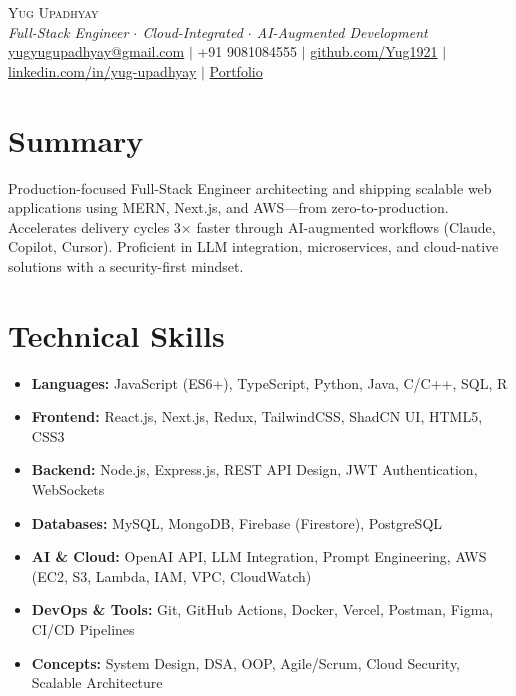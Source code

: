 \documentclass[letterpaper,10pt]{article}
\newcommand{\resumeItem}[1]{\item\small{#1\vspace{0.5pt}}}
\begin{document}
\begin{center}
  {\huge \scshape Yug Upadhyay} \\ \vspace{3pt}
  \textit{Full-Stack Engineer $\cdot$ Cloud-Integrated $\cdot$ AI-Augmented Development} \\ \vspace{4pt}
  \small
  \href{mailto:yugyugupadhyay@gmail.com}{yugyugupadhyay@gmail.com} $|$
  +91 9081084555 $|$
  \href{https://github.com/Yug1921}{github.com/Yug1921} $|$
  \href{https://linkedin.com/in/yug-upadhyay}{linkedin.com/in/yug-upadhyay} $|$
  \href{https://www.yug21.tech/}{Portfolio} 
\end{center}



\section*{ Summary}
\vspace{2pt}
\small Production-focused Full-Stack Engineer architecting and shipping scalable web applications using MERN, Next.js, and AWS—from zero-to-production. Accelerates delivery cycles 3× faster through AI-augmented workflows (Claude, Copilot, Cursor). Proficient in LLM integration, microservices, and cloud-native solutions with a security-first mindset.  

\section*{Technical Skills}
\begin{itemize}
  \resumeItem{\textbf{Languages:} JavaScript (ES6+), TypeScript, Python, Java, C/C++, SQL, R}
  \resumeItem{\textbf{Frontend:} React.js, Next.js, Redux, TailwindCSS, ShadCN UI, HTML5, CSS3}
  \resumeItem{\textbf{Backend:} Node.js, Express.js, REST API Design, JWT Authentication, WebSockets}
  \resumeItem{\textbf{Databases:} MySQL, MongoDB, Firebase (Firestore), PostgreSQL}
  \resumeItem{\textbf{AI \& Cloud:} OpenAI API, LLM Integration, Prompt Engineering, AWS (EC2, S3, Lambda, IAM, VPC, CloudWatch)}
  \resumeItem{\textbf{DevOps \& Tools:} Git, GitHub Actions, Docker, Vercel, Postman, Figma, CI/CD Pipelines}
  \resumeItem{\textbf{Concepts:} System Design, DSA, OOP, Agile/Scrum, Cloud Security, Scalable Architecture}
\end{itemize}
\end{document}
